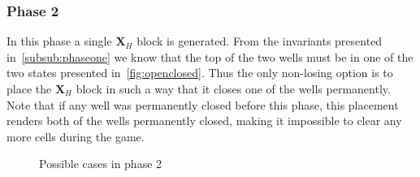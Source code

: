 \subsubsection{Phase 2}
\label{subsub:phasetwo}
In this phase a single $\mathbf{X}_H$ block is generated. From the invariants presented in~\ref{subsub:phaseone} we know that the top of the two wells must be in one of the two states presented in~\autoref{fig:openclosed}. Thus the only non-losing option is to place the $\mathbf{X}_H$ block in such a way that it closes one of the wells permanently. Note that if any well was permanently closed before this phase, this placement renders both of the wells permanently closed, making it impossible to clear any more cells during the game.

\begin{figure}[H]
    \centering
    \begin{subfigure}[b]{0.35\textwidth}
        \caption{}
        \vspace*{0.5cm}
    \end{subfigure}
    \hspace{0.05\textwidth}
    \begin{subfigure}[b]{0.35\textwidth}
        \caption{}
        \vspace*{0.5cm}
    \end{subfigure}

    \begin{subfigure}[b]{0.35\textwidth}
        \caption{}
    \end{subfigure}

    \caption{Possible cases in phase 2}
    \label{fig:placement}
\end{figure}
